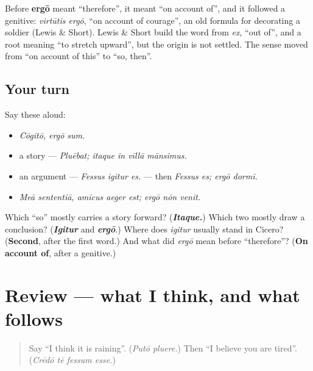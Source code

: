 \begin{cousinweb}
Before \textbf{ergō} meant \textquotedblleft{}therefore\textquotedblright{}, it meant \textquotedblleft{}on account of\textquotedblright{}, and it followed a genitive: \emph{virtūtis ergō}, \textquotedblleft{}on account of courage\textquotedblright{}, an old formula for decorating a soldier (Lewis \& Short). Lewis \& Short build the word from \emph{ex}, \textquotedblleft{}out of\textquotedblright{}, and a root meaning \textquotedblleft{}to stretch upward\textquotedblright{}, but the origin is not settled. The sense moved from \textquotedblleft{}on account of this\textquotedblright{} to \textquotedblleft{}so, then\textquotedblright{}.
\end{cousinweb}

\subsection*{Your turn}
Say these aloud:

\begin{itemize}
\raggedright
  \item \emph{Cōgitō, ergō sum.}
  \item a story — \emph{Pluēbat; itaque in vīllā mānsimus.}
  \item an argument — \emph{Fessus igitur es.} — then \emph{Fessus es; ergō dormī.}
  \item \emph{Meā sententiā, amīcus aeger est; ergō nōn venit.}
\end{itemize}

\begin{tcolorbox}[breakable,colback=teal!4,colframe=teal!35!black,title={Before you move on}]
Which \textquotedblleft{}so\textquotedblright{} mostly carries a story forward? (\emph{\textbf{Itaque.}}) Which two mostly draw a conclusion? (\emph{\textbf{Igitur}} and \emph{\textbf{ergō}}.) Where does \emph{igitur} usually stand in Cicero? (\textbf{Second}, after the first word.) And what did \emph{ergō} mean before \textquotedblleft{}therefore\textquotedblright{}? (\textbf{On account of}, after a genitive.)
\end{tcolorbox}
\section[(review)]{Review — what I think, and what follows}

\label{lesson:LA-R283-what-i-think}



\begin{quote}
Say \textquotedblleft{}I think it is raining\textquotedblright{}. (\emph{Putō pluere.}) Then \textquotedblleft{}I believe you are tired\textquotedblright{}. (\emph{Crēdō tē fessum esse.})
\end{quote}

